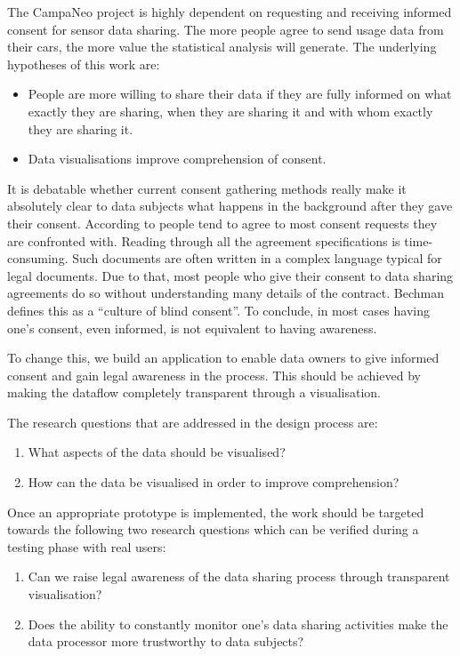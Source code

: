 \documentclass[../paper.tex]{subfiles}
\begin{document}
  The CampaNeo project is highly dependent on requesting and receiving informed
  consent for sensor data sharing. The more people agree to send usage data from
  their cars, the more value the statistical analysis will generate. The
  underlying hypotheses of this work are:

  \begin{itemize}
    \item People are more willing to share their data if they are fully informed
          on what exactly they are sharing, when they are sharing it and with
          whom exactly they are sharing it.
    \item Data visualisations improve comprehension of consent.
  \end{itemize}

  It is debatable whether current consent gathering methods really make it
  absolutely clear to data subjects what happens in the background after they
  gave their consent. According to \cite{Borgesisus_informed_consent_2015} people
  tend to agree to most consent requests they are confronted with.
  Reading through all the agreement specifications is time-consuming. Such
  documents are often written in a complex language typical for legal documents.
  Due to that, most people who give their consent to data sharing agreements do so
  without understanding many details of the contract. Bechman \cite{Bechmann2014}
  defines this as a “culture of blind consent”. To conclude, in most cases having
  one’s consent, even informed, is not equivalent to having awareness.

  To change this, we build an application to enable data owners to give informed
  consent and gain legal awareness in the process. This should be achieved by
  making the dataflow completely transparent through a visualisation.

  The research questions that are addressed in the design process are:

  \begin{enumerate}
    \item What aspects of the data should be visualised?
    \item How can the data be visualised in order to improve comprehension?
  \end{enumerate}

  Once an appropriate prototype is implemented, the work should be targeted
  towards the following two research questions which can be verified during a
  testing phase with real users:

  \begin{enumerate}
    \item Can we raise legal awareness of the data sharing process through
          transparent visualisation?
    \item Does the ability to constantly monitor one’s data sharing activities
          make the data processor more trustworthy to data subjects?
  \end{enumerate}
\end{document}
